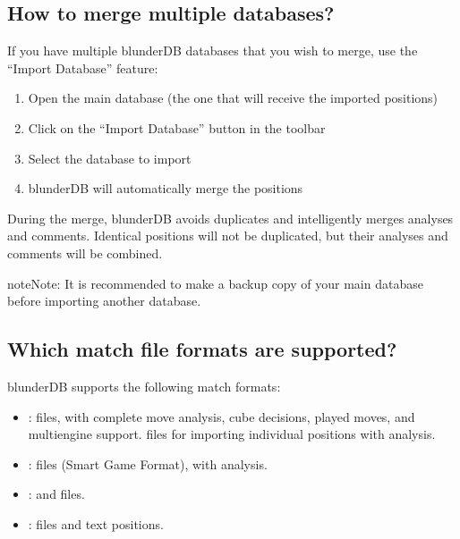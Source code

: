 \documentclass[letterpaper,10pt,english]{sphinxmanual}
\begin{document}
\subsection{How to merge multiple databases?}
\label{\detokenize{faq:comment-fusionner-plusieurs-bases-de-donnees}}
\sphinxAtStartPar
If you have multiple blunderDB databases that you wish to merge, use the “Import Database” feature:
\begin{enumerate}
%
\item {} 
\sphinxAtStartPar
Open the main database (the one that will receive the imported positions)

\item {} 
\sphinxAtStartPar
Click on the “Import Database” button in the toolbar

\item {} 
\sphinxAtStartPar
Select the database to import

\item {} 
\sphinxAtStartPar
blunderDB will automatically merge the positions

\end{enumerate}

\sphinxAtStartPar
During the merge, blunderDB avoids duplicates and intelligently merges analyses and comments. Identical positions will not be duplicated, but their analyses and comments will be combined.

\begin{sphinxadmonition}{note}{Note:}
\sphinxAtStartPar
It is recommended to make a backup copy of your main database before importing another database.
\end{sphinxadmonition}


\subsection{Which match file formats are supported?}
\label{\detokenize{faq:quels-formats-de-fichiers-de-match-sont-supportes}}
\sphinxAtStartPar
blunderDB supports the following match formats:
\begin{itemize}
\item {} 
\sphinxAtStartPar
{}:  files, with complete move analysis, cube decisions, played moves, and multi\sphinxhyphen{}engine support.  files for importing individual positions with analysis.

\item {} 
\sphinxAtStartPar
{}:  files (Smart Game Format), with analysis.

\item {} 
\sphinxAtStartPar
{}:  and  files.

\item {} 
\sphinxAtStartPar
{}:  files and text positions.

\end{itemize}
\end{document}
